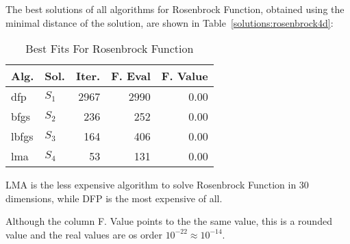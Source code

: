 The best solutions of all algorithms for Rosenbrock Function, obtained using the minimal
distance of the solution, are shown in Table~\ref{solutions:rosenbrock4d}:

\begin{table}[H]
\centering
\caption{Best Fits For Rosenbrock Function}
\label{solutions:rosenbrock30d}
\begin{tabular}{llrrr}
\toprule
 Alg. &    Sol. &  Iter. &  F. Eval &  F. Value \\
\midrule
  dfp & $S_{1}$ &   2967 &     2990 &      0.00 \\
 bfgs & $S_{2}$ &    236 &      252 &      0.00 \\
lbfgs & $S_{3}$ &    164 &      406 &      0.00 \\
  lma & $S_{4}$ &     53 &      131 &      0.00 \\
\bottomrule
\end{tabular}
\end{table}

LMA is the less expensive algorithm to solve Rosenbrock Function in 30 dimensions, while DFP
is the most expensive of all.

Although the column F. Value points to the the same value, this is a rounded value
and the real values are os order $10^{-22} \approx 10^{-14}$.